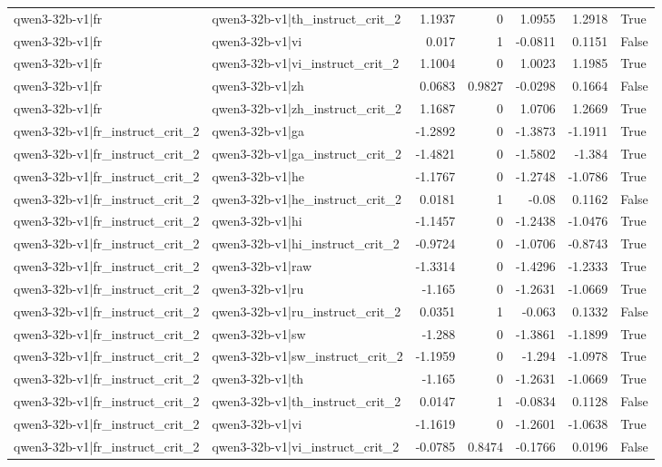 \begin{table}
\begin{tabular}{l l r r r r l}
qwen3-32b-v1|fr & qwen3-32b-v1|th_instruct_crit_2 & 1.1937 & 0 & 1.0955 & 1.2918 & True \\
qwen3-32b-v1|fr & qwen3-32b-v1|vi & 0.017 & 1 & -0.0811 & 0.1151 & False \\
qwen3-32b-v1|fr & qwen3-32b-v1|vi_instruct_crit_2 & 1.1004 & 0 & 1.0023 & 1.1985 & True \\
qwen3-32b-v1|fr & qwen3-32b-v1|zh & 0.0683 & 0.9827 & -0.0298 & 0.1664 & False \\
qwen3-32b-v1|fr & qwen3-32b-v1|zh_instruct_crit_2 & 1.1687 & 0 & 1.0706 & 1.2669 & True \\
qwen3-32b-v1|fr_instruct_crit_2 & qwen3-32b-v1|ga & -1.2892 & 0 & -1.3873 & -1.1911 & True \\
qwen3-32b-v1|fr_instruct_crit_2 & qwen3-32b-v1|ga_instruct_crit_2 & -1.4821 & 0 & -1.5802 & -1.384 & True \\
qwen3-32b-v1|fr_instruct_crit_2 & qwen3-32b-v1|he & -1.1767 & 0 & -1.2748 & -1.0786 & True \\
qwen3-32b-v1|fr_instruct_crit_2 & qwen3-32b-v1|he_instruct_crit_2 & 0.0181 & 1 & -0.08 & 0.1162 & False \\
qwen3-32b-v1|fr_instruct_crit_2 & qwen3-32b-v1|hi & -1.1457 & 0 & -1.2438 & -1.0476 & True \\
qwen3-32b-v1|fr_instruct_crit_2 & qwen3-32b-v1|hi_instruct_crit_2 & -0.9724 & 0 & -1.0706 & -0.8743 & True \\
qwen3-32b-v1|fr_instruct_crit_2 & qwen3-32b-v1|raw & -1.3314 & 0 & -1.4296 & -1.2333 & True \\
qwen3-32b-v1|fr_instruct_crit_2 & qwen3-32b-v1|ru & -1.165 & 0 & -1.2631 & -1.0669 & True \\
qwen3-32b-v1|fr_instruct_crit_2 & qwen3-32b-v1|ru_instruct_crit_2 & 0.0351 & 1 & -0.063 & 0.1332 & False \\
qwen3-32b-v1|fr_instruct_crit_2 & qwen3-32b-v1|sw & -1.288 & 0 & -1.3861 & -1.1899 & True \\
qwen3-32b-v1|fr_instruct_crit_2 & qwen3-32b-v1|sw_instruct_crit_2 & -1.1959 & 0 & -1.294 & -1.0978 & True \\
qwen3-32b-v1|fr_instruct_crit_2 & qwen3-32b-v1|th & -1.165 & 0 & -1.2631 & -1.0669 & True \\
qwen3-32b-v1|fr_instruct_crit_2 & qwen3-32b-v1|th_instruct_crit_2 & 0.0147 & 1 & -0.0834 & 0.1128 & False \\
qwen3-32b-v1|fr_instruct_crit_2 & qwen3-32b-v1|vi & -1.1619 & 0 & -1.2601 & -1.0638 & True \\
qwen3-32b-v1|fr_instruct_crit_2 & qwen3-32b-v1|vi_instruct_crit_2 & -0.0785 & 0.8474 & -0.1766 & 0.0196 & False \\

\end{tabular}
\end{table}
